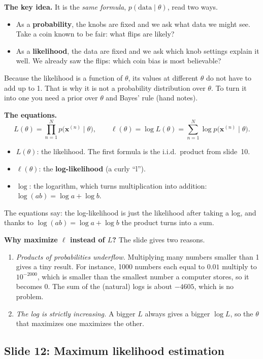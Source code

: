 \textbf{The key idea.} It is the \emph{same formula}, $p(\text{data}\mid\theta)$, read two ways.
\begin{itemize}
\item As a \textbf{probability}, the knobs are fixed and we ask what data we might see. Take a coin known to be fair: what flips are likely?
\item As a \textbf{likelihood}, the data are fixed and we ask which knob settings explain it well. We already saw the flips: which coin bias is most believable?
\end{itemize}
Because the likelihood is a function of $\theta$, its values at different $\theta$ do not have to add up to 1. That is why it is not a probability distribution over $\theta$. To turn it into one you need a prior over $\theta$ and Bayes' rule (hand notes).

\textbf{The equations.}
\[
L(\theta)=\prod_{n=1}^{N}p\big(\mathbf{x}^{(n)}\mid\theta\big),\qquad
\ell(\theta)=\log L(\theta)=\sum_{n=1}^{N}\log p\big(\mathbf{x}^{(n)}\mid\theta\big).
\]
\begin{itemize}
\item $L(\theta)$: the likelihood. The first formula is the i.i.d.\ product from slide~10.
\item $\ell(\theta)$: the \textbf{log-likelihood} (a curly ``l'').
\item $\log$: the logarithm, which turns multiplication into addition: $\log(ab)=\log a+\log b$.
\end{itemize}
The equations say: the log-likelihood is just the likelihood after taking a log, and thanks to $\log(ab)=\log a+\log b$ the product turns into a sum.

\textbf{Why maximize $\ell$ instead of $L$?} The slide gives two reasons.
\begin{enumerate}
\item \textit{Products of probabilities underflow.} Multiplying many numbers smaller than 1 gives a tiny result. For instance, 1000 numbers each equal to $0.01$ multiply to $10^{-2000}$, which is smaller than the smallest number a computer stores, so it becomes 0. The sum of the (natural) logs is about $-4605$, which is no problem.
\item \textit{The log is strictly increasing.} A bigger $L$ always gives a bigger $\log L$, so the $\theta$ that maximizes one maximizes the other.
\end{enumerate}

\subsection*{Slide 12: Maximum likelihood estimation}

